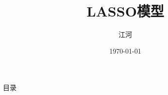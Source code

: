 \documentclass{beamer}
\title{LASSO模型}
\author{江河}
\institute{西安交通大学}
\date{\today}
\begin{document}
\begin{frame}\transboxout
	\titlepage
\end{frame}
\begin{frame}{目录}
	\tableofcontents[hideallsubsections]
\end{frame}
\end{document}
